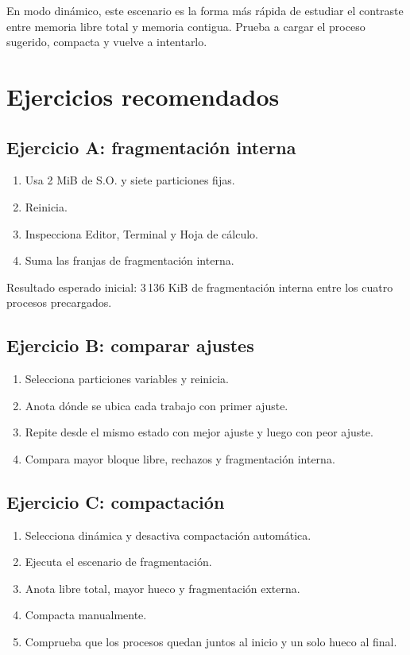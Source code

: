 \documentclass[11pt,a4paper]{article}
\begin{document}
En modo dinámico, este escenario es la forma más rápida de estudiar el contraste
entre memoria libre total y memoria contigua. Prueba a cargar el proceso sugerido,
compacta y vuelve a intentarlo.

\section{Ejercicios recomendados}

\subsection{Ejercicio A: fragmentación interna}

\begin{enumerate}
  \item Usa 2 MiB de S.O. y siete particiones fijas.
  \item Reinicia.
  \item Inspecciona Editor, Terminal y Hoja de cálculo.
  \item Suma las franjas de fragmentación interna.
\end{enumerate}

Resultado esperado inicial: 3\,136 KiB de fragmentación interna entre los cuatro
procesos precargados.

\subsection{Ejercicio B: comparar ajustes}

\begin{enumerate}
  \item Selecciona particiones variables y reinicia.
  \item Anota dónde se ubica cada trabajo con primer ajuste.
  \item Repite desde el mismo estado con mejor ajuste y luego con peor ajuste.
  \item Compara mayor bloque libre, rechazos y fragmentación interna.
\end{enumerate}

\subsection{Ejercicio C: compactación}

\begin{enumerate}
  \item Selecciona dinámica y desactiva compactación automática.
  \item Ejecuta el escenario de fragmentación.
  \item Anota libre total, mayor hueco y fragmentación externa.
  \item Compacta manualmente.
  \item Comprueba que los procesos quedan juntos al inicio y un solo hueco al final.
\end{enumerate}
\end{document}
